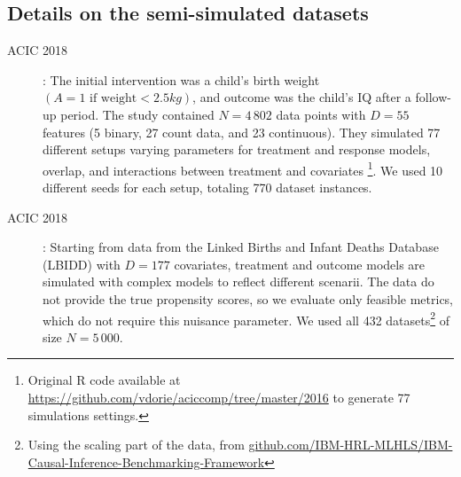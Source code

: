 \documentclass[11pt]{article}
\let\cite=\supercite
\begin{document}
\begin{appendices}
    \subsection{ Details on the semi-simulated datasets}\label{apd:experiments:datasets}


    \begin{description}
        \item[ACIC 2018] \cite{dorie_automated_2019}:  The initial intervention was a child’s birth
            weight $(A = 1 \text{ if weight} < 2.5 kg)$, and outcome was the child’s
            IQ after a follow-up period. The study contained $N=4\,802$ data
            points with $D=55$ features (5 binary, 27 count data, and 23
            continuous). They simulated 77 different setups varying parameters
            for treatment and response models, overlap, and interactions between treatment and
            covariates \footnote{Original R code available at
                \url{https://github.com/vdorie/aciccomp/tree/master/2016}
                to generate 77 simulations settings.}. We used 10 different seeds
            for each setup, totaling 770 dataset instances.

        \item[ACIC 2018] \cite{shimoni_benchmarking_2018}: Starting from data from
            the Linked Births and Infant Deaths Database (LBIDD)
            \cite{macdorman_infant_1998} with $D=177$ covariates, treatment and
            outcome models are simulated with complex models to reflect different
            scenarii. The data do not provide the true propensity scores, so we
            evaluate only feasible metrics, which do not require this nuisance
            parameter. We used all 432 datasets\footnote{Using the scaling part of
                the data, from
                \href{https://github.com/IBM-HRL-MLHLS/IBM-Causal-Inference-Benchmarking-Framework}{github.com/IBM-HRL-MLHLS/IBM-Causal-Inference-Benchmarking-Framework}}
            of size $N=5\,000$.



\end{description}
\end{appendices}
\end{document}
